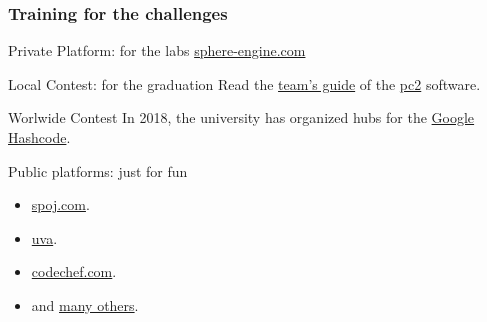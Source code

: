 \documentclass{beamer}
\begin{document}
\begin{frame}
  \frametitle{Training for the challenges}
  \begin{block}{Private Platform: for the labs}
    \href{https://sphere-engine.com/}{sphere-engine.com}
  \end{block}

    \begin{block}{Local Contest: for the graduation}
      Read the \href{https://pc2.ecs.csus.edu/doc/v9/9.5.3/PC2V9TeamGuide.pdf}{team's guide} of the \href{https://pc2.ecs.csus.edu/}{pc2} software.
    \end{block}

    \begin{block}{Worlwide Contest}
      In 2018, the university has organized hubs for the \href{https://hashcode.withgoogle.com/}{Google Hashcode}.
    \end{block}

    \begin{block}{Public platforms: just for fun}
    \begin{itemize}
    \item \href{https://www.spoj.com/}{spoj.com}.
    \item \href{https://uva.onlinejudge.org/}{uva}.
    \item \href{http://codechef.com/}{codechef.com}.
    \item and \href{https://ryanstutorials.net/programming-challenges/}{many others}.
    \end{itemize}
  \end{block}
\end{frame}
\end{document}
